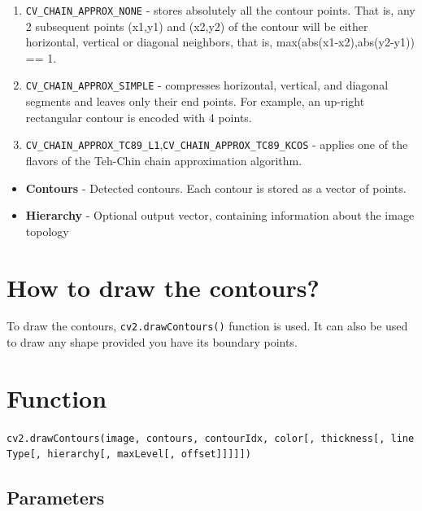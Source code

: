 \documentclass[]{article}
\providecommand{\tightlist}{%
  \setlength{\itemsep}{0pt}\setlength{\parskip}{0pt}}
\begin{document}
\begin{enumerate}
\def\labelenumi{\arabic{enumi}.}
\tightlist
\item
  \texttt{CV\_CHAIN\_APPROX\_NONE} - stores absolutely all the contour
  points. That is, any 2 subsequent points (x1,y1) and (x2,y2) of the
  contour will be either horizontal, vertical or diagonal neighbors,
  that is, max(abs(x1-x2),abs(y2-y1)) == 1.\\
\item
  \texttt{CV\_CHAIN\_APPROX\_SIMPLE} - compresses horizontal, vertical,
  and diagonal segments and leaves only their end points. For example,
  an up-right rectangular contour is encoded with 4 points.\\
\item
  \texttt{CV\_CHAIN\_APPROX\_TC89\_L1},\texttt{CV\_CHAIN\_APPROX\_TC89\_KCOS}
  - applies one of the flavors of the Teh-Chin chain approximation
  algorithm.\\
\end{enumerate}

\begin{itemize}
\tightlist
\item
  \textbf{Contours} - Detected contours. Each contour is stored as a
  vector of points.\\
\item
  \textbf{Hierarchy} - Optional output vector, containing information
  about the image topology
\end{itemize}

\section{How to draw the contours?}\label{how-to-draw-the-contours}

To draw the contours, \texttt{cv2.drawContours()} function is used. It
can also be used to draw any shape provided you have its boundary
points.

\section{Function}\label{function-1}

\texttt{cv2.drawContours(image,\ contours,\ contourIdx,\ color{[},\ thickness{[},\ lineType{[},\ hierarchy{[},\ maxLevel{[},\ offset{]}{]}{]}{]}{]})}

\subsection{Parameters}\label{parameters-1}
\end{document}
